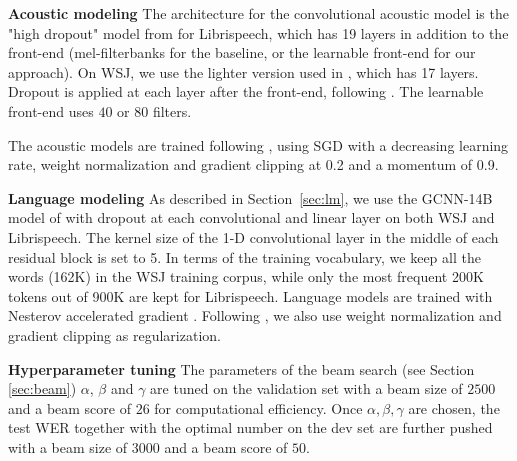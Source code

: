 \documentclass[a4paper]{article}
\begin{document}
{\bf Acoustic modeling} The architecture for the convolutional acoustic model is the "high dropout" model from \cite{wav2letter2} for Librispeech, which has 19 layers in addition to the front-end (mel-filterbanks for the baseline, or the learnable front-end for our approach). On WSJ, we use the lighter version used in \cite{tdfbanks2}, which has 17 layers. Dropout is applied at each layer after the front-end, following \cite{wav2letter}. The learnable front-end uses $40$ or $80$ filters. 

The acoustic models are trained following \cite{wav2letter2,tdfbanks2}, using SGD with a decreasing learning rate, weight normalization and gradient clipping at 0.2 and a momentum of 0.9.

{\bf Language modeling} As described in Section~\ref{sec:lm}, we use the GCNN-14B model of \cite{glu} with dropout at each convolutional and linear layer on both WSJ and Librispeech. The kernel size of the 1-D convolutional layer in the middle of each residual block is set to 5. In terms of the training vocabulary, we keep all the words (162K) in the WSJ training corpus, while only the most frequent 200K tokens out of 900K are kept for Librispeech. 
Language models are trained with Nesterov accelerated gradient \cite{nag}. Following \cite{glu}, we also use weight normalization and gradient clipping as regularization.

{\bf Hyperparameter tuning}
The parameters of the beam search (see Section \ref{sec:beam}) $\alpha$, $\beta$ and $\gamma$ are tuned on the validation set with a beam size of $2500$ and a beam score of $26$ for computational efficiency. Once $\alpha,\beta,\gamma$ are chosen, the test WER together with the optimal number on the dev set are further pushed with a beam size of $3000$ and a beam score of $50$.
\end{document}

